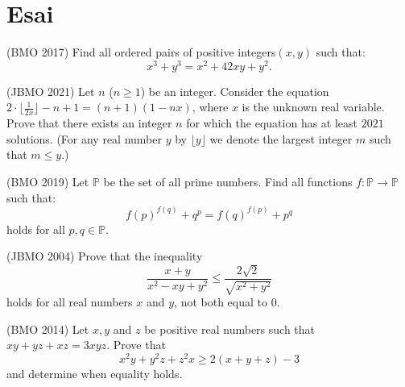 \documentclass[11pt]{scrartcl}
\begin{document}
    \section{Esai}
    \begin{soalbaru}(BMO 2017)
    Find all ordered pairs of positive integers$ (x, y)$ such that:$$x^3+y^3=x^2+42xy+y^2.$$
    \end{soalbaru}
    
    \begin{soalbaru}(JBMO 2021)
    Let $n$ ($n \ge 1$) be an integer. Consider the equation $2\cdot \lfloor{\frac{1}{2x}}\rfloor - n + 1 = (n + 1)(1 - nx)$, where $x$ is the unknown real variable. Prove that there exists an integer $n$ for which the equation has at least $2021$ solutions. (For any real number $y$ by $\lfloor{y} \rfloor$ we denote the largest integer $m$ such that $m \le y$.)
    \end{soalbaru}
    
    \begin{soalbaru}(BMO 2019)
    Let $\mathbb{P}$ be the set of all prime numbers. Find all functions $f:\mathbb{P}\rightarrow\mathbb{P}$ such that:
$$f(p)^{f(q)}+q^p=f(q)^{f(p)}+p^q$$holds for all $p,q\in\mathbb{P}$.
    \end{soalbaru}

    
    \begin{soalbaru}(JBMO 2004)
    Prove that the inequality\[ \frac{ x+y}{x^2-xy+y^2 } \leq \frac{ 2\sqrt 2 }{\sqrt{ x^2 +y^2 } } \]holds for all real numbers $x$ and $y$, not both equal to 0.
    \end{soalbaru}
    
    \begin{soalbaru}(BMO 2014)
    Let $x,y$ and $z$ be positive real numbers such that $xy+yz+xz=3xyz$. Prove that\[ x^2y+y^2z+z^2x \ge 2(x+y+z)-3 \]and determine when equality holds.
    \end{soalbaru}
\end{document}
